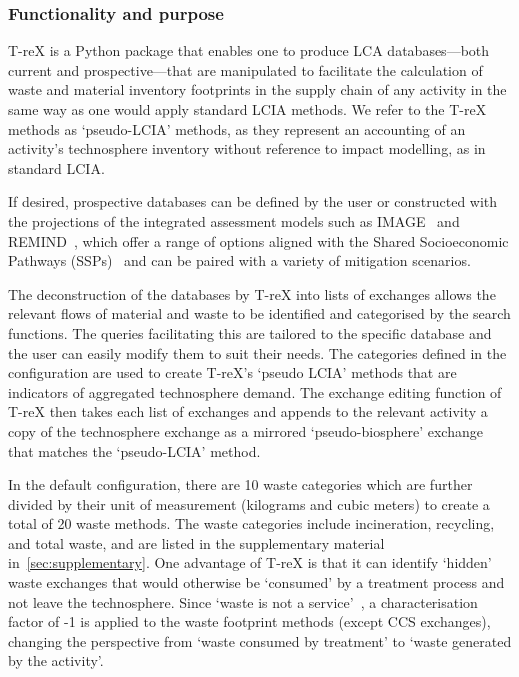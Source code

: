 \documentclass[a4paper,fleqn]{cas-dc}
\begin{document}
\subsubsection{Functionality and purpose}

T-reX is a Python package that enables one to produce LCA databases---both current and prospective---that are manipulated to facilitate the calculation of waste and material inventory footprints in the supply chain of any activity in the same way as one would apply standard LCIA methods. We refer to the T-reX methods as `pseudo-LCIA' methods, as they represent an accounting of an activity's technosphere inventory without reference to impact modelling, as in standard LCIA.

If desired, prospective databases can be defined by the user or constructed with the projections of the integrated assessment models such as IMAGE~\citep{stehfest2014image} and REMIND~\citep{remind2020model}, which offer a range of options aligned with the Shared Socioeconomic Pathways (SSPs)~\citep{ssp2020ghg} and can be paired with a variety of mitigation scenarios.

The deconstruction of the databases by T-reX into lists of exchanges allows the relevant flows of material and waste to be identified and categorised by the search functions. The queries facilitating this are tailored to the specific database and the user can easily modify them to suit their needs. The categories defined in the configuration are used to create T-reX's `pseudo LCIA' methods that are indicators of aggregated technosphere demand. The exchange editing function of T-reX then takes each list of exchanges and appends to the relevant activity a copy of the technosphere exchange as a mirrored `pseudo-biosphere' exchange that matches the `pseudo-LCIA' method.

In the default configuration, there are 10 waste categories which are further divided by their unit of measurement (kilograms and cubic meters) to create a total of 20 waste methods. The waste categories include incineration, recycling, and total waste, and are listed in the supplementary material in~\autoref{sec:supplementary}. One advantage of T-reX is that it can identify `hidden' waste exchanges that would otherwise be `consumed' by a treatment process and not leave the technosphere. Since `waste is not a service'~\citep{guinee2021wasteisnotaservice}, a characterisation factor of -1 is applied to the waste footprint methods (except CCS exchanges), changing the perspective from `waste consumed by treatment' to `waste generated by the activity'.
\end{document}
